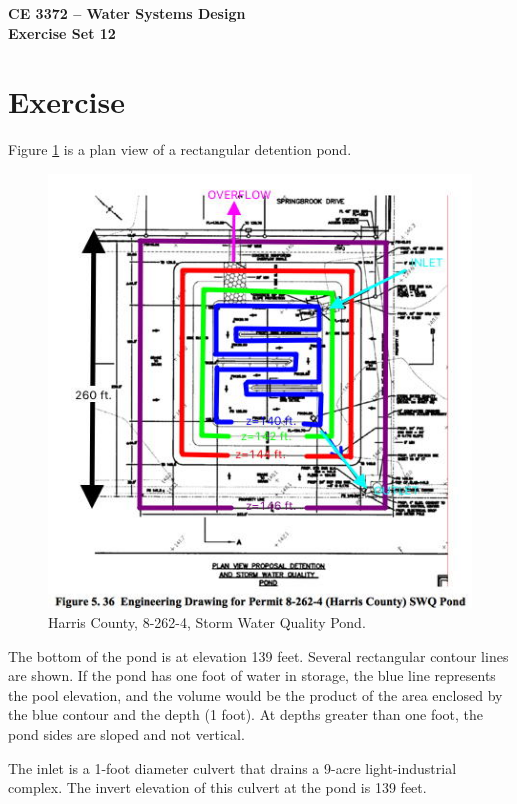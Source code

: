 \documentclass[12pt]{article}
\begin{document}
\begin{center}
{\textbf{{CE 3372 -- Water Systems Design} \\ {Exercise Set 12}}}
\end{center}

\section*{\small{Exercise}}
Figure \ref{fig:detention} is a plan view of a rectangular detention pond.   

\begin{figure}[h!] %
   \centering
   \includegraphics[width=6in]{detention.jpg} 
   \caption{Harris County, 8-262-4, Storm Water Quality Pond.}
   \label{fig:detention}
\end{figure}
\clearpage
The bottom of the pond is at elevation 139 feet.   
Several rectangular contour lines are shown.   
If the pond has one foot of water in storage, the blue line represents the pool elevation, and the volume would be the product of the area enclosed by the blue contour and the depth (1 foot).   
At depths greater than one foot, the pond sides are sloped and not vertical.

The inlet is a 1-foot diameter culvert that drains a 9-acre light-industrial complex.   
The invert elevation of this culvert at the pond is 139 feet.
\end{document}
